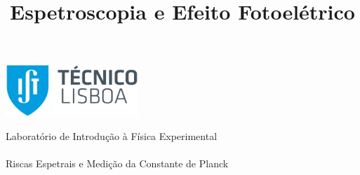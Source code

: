 \thispagestyle {empty}
\begin{center}
\begin{minipage}[c][5cm][t]{\textwidth}
\begin{center}
\includegraphics[width=5cm]{../IST_A_RGB_POS.png}
\end{center}

\end{minipage}
\begin{minipage}[t][10cm][c]{\textwidth}
\centering
{\FontMb Laboratório de Introdução à Física Experimental} \\
\paragraph{}
\centering
{\FontLb\Huge \title{Espetroscopia e Efeito Fotoelétrico}}
\paragraph{}
{\FontMb Riscas Espetrais e Medição da Constante de Planck} \\
\paragraph{}
{}
\end{minipage}

\begin{minipage}[c][1.5cm][c]{\textwidth}
\centering
{\FontLn }
\end{minipage}

\begin{minipage}[c][1.5cm][c]{\textwidth}
\centering



\end{minipage}
\begin{minipage}[c][3cm][c]{\textwidth}
\centering
\renewcommand{\arraystretch}{1.4}

\maketitle

\vspace{-5mm}
\hline
\vspace{-3mm}
\begin{center}
\centering

\end{center}
\end{minipage}
\end{center}
